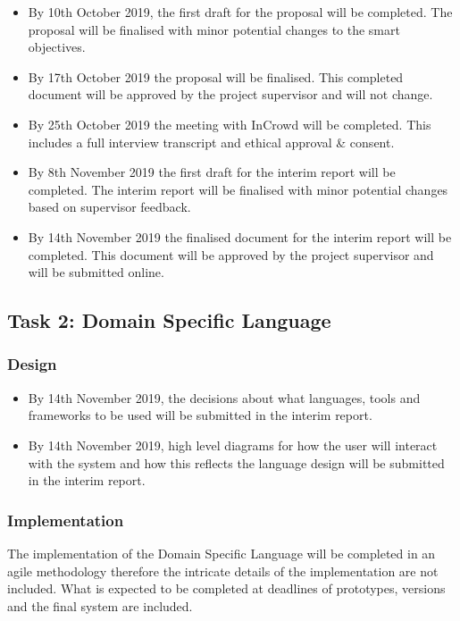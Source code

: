 \documentclass[chapterprefix=false]{scrreprt}
\begin{document}
\begin{itemize}
 \setlength\itemsep{-0.75em}
 \item By 10th October 2019, the first draft for the proposal will be completed. The proposal will be finalised with minor potential changes to the smart objectives. 
 \item By 17th October 2019 the proposal will be finalised. This completed document will be approved by the project supervisor and will not change.
 \item By 25th October 2019 the meeting with InCrowd will be completed. This includes a full interview transcript and ethical approval \& consent.
 \item By 8th November 2019 the first draft for the interim report will be completed. The interim report will be finalised with minor potential changes based on supervisor feedback.
 \item By 14th November 2019 the finalised document for the interim report will be completed. This document will be approved by the project supervisor and will be submitted online.
\end{itemize}

\subsection{Task 2: Domain Specific Language}

\subsubsection{Design}

\begin{itemize}
 \setlength\itemsep{-0.75em}
 \item By 14th November 2019, the decisions about what languages, tools and frameworks to be used will be submitted in the interim report.
 \item By 14th November 2019, high level diagrams for how the user will interact with the system and how this reflects the language design will be submitted in the interim report.
\end{itemize}

\subsubsection{Implementation}

The implementation of the Domain Specific Language will be completed in an agile methodology therefore the intricate details of the implementation are not included. What is expected to be completed at deadlines of prototypes, versions and the final system are included.
\end{document}
